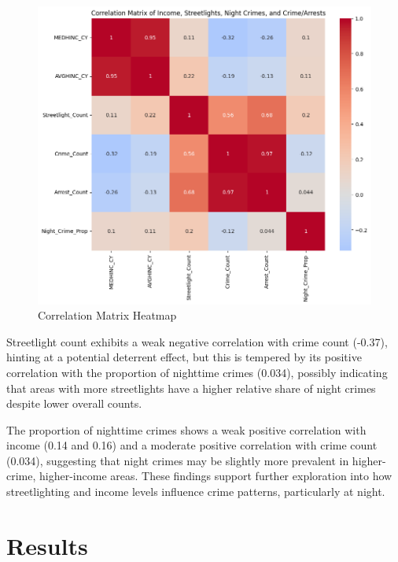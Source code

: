 \documentclass{report}
\begin{document}
    
   \begin{figure}[h]
    	\begin{center}
    		\advance\leftskip-3cm
    		\advance\rightskip-3cm
    		\includegraphics[keepaspectratio=true,scale=.6]{heatmap}
    		\caption{Correlation Matrix Heatmap}
    		\label{fig:heatmap}
    	\end{center}
    \end{figure}
    
    
    \par Streetlight count exhibits a weak negative correlation with crime count (-0.37), hinting at a potential deterrent effect, but this is tempered by its positive correlation with the proportion of nighttime crimes (0.034), possibly indicating that areas with more streetlights have a higher relative share of night crimes despite lower overall counts. 
    
    The proportion of nighttime crimes shows a weak positive correlation with income (0.14 and 0.16) and a moderate positive correlation with crime count (0.034), suggesting that night crimes may be slightly more prevalent in higher-crime, higher-income areas. These findings support further exploration into how streetlighting and income levels influence crime patterns, particularly at night.
    
    \chapter{Results}
\end{document}
